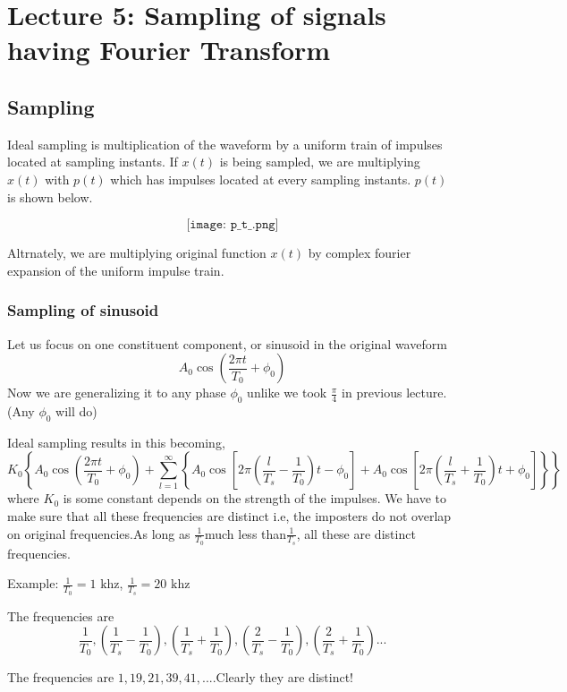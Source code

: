 \section{Lecture 5: Sampling of signals having Fourier Transform}


\subsection{Sampling}

Ideal sampling is multiplication of the waveform by a uniform train of impulses located at sampling instants.
If $x(t)$ is being sampled, we are multiplying $x(t)$ with $p(t)$ which has impulses located at every sampling instants.
$p(t)$ is shown below.

$$\texttt{[image: p\_t\_.png]}$$


Altrnately, we are multiplying original function $x(t)$ by complex fourier expansion of the uniform impulse train.

\subsubsection{Sampling of sinusoid}

Let us focus on one constituent component, or sinusoid in the original waveform $$A_0  \cos ( \frac{2 \pi t}{T_0} + \phi _0 ) $$
Now we are generalizing it to any phase $\phi_0$ unlike we took $\frac{\pi}{4}$ in previous lecture. (Any  $\phi_0 $ will do)

Ideal sampling results in this becoming,
$$ K_0  \left\{ A_0  \cos ( \frac{2 \pi t}{T_0} + \phi _0 )   + \sum_{l=1}^\infty  \left\{  A_0  \cos \left[2\pi(\frac{l}{T_s}-\frac{1}{T_0})t - \phi _0 \right]  +  A_0  \cos \left[2\pi(\frac{l}{T_s}+\frac{1}{T_0})t + \phi _0 \right] \right\} \right\} $$
where $K_0$ is some constant depends on the strength of the impulses.
We have to make sure that all these frequencies are distinct i.e, the imposters do not overlap on original frequencies.As long as $\frac{1}{T_0}$much less than$\frac{1}{T_s}$, all these are distinct frequencies.

Example:  $\frac{1}{T_0} = 1   \mbox{ khz}$, $\frac{1}{T_s} = 20   \mbox{ khz}$
  
  The frequencies are $$\frac{1}{T_0},(\frac{1}{T_s} - \frac{1}{T_0} ),(\frac{1}{T_s} + \frac{1}{T_0}),(\frac{2}{T_s} - \frac{1}{T_0} ),(\frac{2}{T_s} + \frac{1}{T_0})...$$
  
   The frequencies are $ 1,19,21,39,41,...$.Clearly they are distinct!


